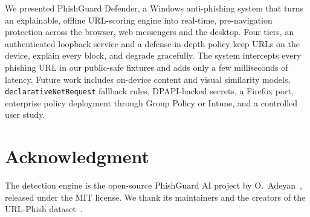 \documentclass[conference]{IEEEtran}
\newcommand{\sys}{PhishGuard Defender}
\newcommand{\code}[1]{\texttt{\small #1}}
\begin{document}
We presented \sys{}, a Windows anti-phishing system that turns an
explainable, offline URL-scoring engine into real-time, pre-navigation
protection across the browser, web messengers and the desktop. Four tiers,
an authenticated loopback service and a defense-in-depth policy keep URLs on
the device, explain every block, and degrade gracefully. The system
intercepts every phishing URL in our public-safe fixtures and adds only a few
milliseconds of latency. Future work includes on-device content and visual
similarity models, \code{declarativeNetRequest} fallback rules, DPAPI-backed
secrets, a Firefox port, enterprise policy deployment through Group Policy or
Intune, and a controlled user study.

\section*{Acknowledgment}
The detection engine is the open-source PhishGuard AI project by
O.~Adeyan~\cite{phishguardai}, released under the MIT license. We thank its
maintainers and the creators of the URL-Phish dataset~\cite{urlphish}.



\end{document}
